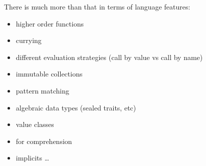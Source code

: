 \documentclass[10pt]{beamer}
\providecommand{\eg}{e.\,g.}
\begin{document}


















\begin{frame}
There is much more than that in terms of language features:
\begin{itemize}
 \item higher order functions 
\item currying 
\item different evaluation strategies (call by value vs call by name) 
\item immutable collections 
\item pattern matching 
\item algebraic data types (sealed traits, etc)
\item value classes 
\item for comprehension 
\item implicits \ldots 
\end{itemize}
\end{frame}
\end{document}
